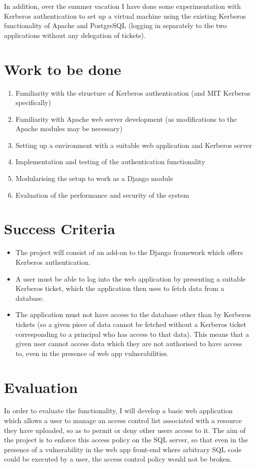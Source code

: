\documentclass{standalone}
\begin{document}
In addition, over the summer vacation I have done some experimentation with Kerberos authentication to set up a virtual machine using the existing Kerberos functionality of Apache and PostgreSQL (logging in separately to the two applications without any delegation of tickets).

\section*{Work to be done}
\begin{enumerate}
\item Familiarity with the structure of Kerberos authentication (and MIT Kerberos specifically)
\item Familiarity with Apache web server development (as modifications to the Apache modules may be necessary)
\item Setting up a environment with a suitable web application and Kerberos server
\item Implementation and testing of the authentication functionality
\item Modularising the setup to work as a Django module
\item Evaluation of the performance and security of the system
\end{enumerate}

\section*{Success Criteria}
\begin{itemize}
\item The project will consist of an add-on to the Django framework which offers Kerberos authentication.
\item A user must be able to log into the web application by presenting a suitable Kerberos ticket, which the application then uses to fetch data from a database.
\item The application must not have access to the database other than by Kerberos tickets (so a given piece of data cannot be fetched without a Kerberos ticket corresponding to a principal who has access to that data). This means that a given user cannot access data which they are not authorised to have access to, even in the presence of web app vulnerabilities.
\end{itemize}

\section*{Evaluation}
In order to evaluate the functionality, I will develop a basic web application which allows a user to manage an access control list associated with a resource they have uploaded, so as to permit or deny other users access to it. The aim of the project is to enforce this access policy on the SQL server, so that even in the presence of a vulnerability in the web app front-end where arbitrary SQL code could be executed by a user, the access control policy would not be broken.
\end{document}
